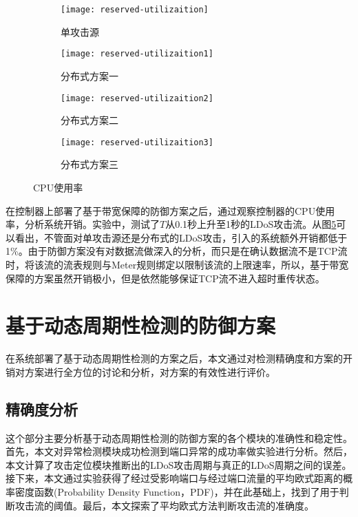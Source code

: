 \begin{figure}
    \begin{subfigure}{.49\textwidth}
        \centering
        \texttt{[image: reserved-utilizaition]}
        \caption{单攻击源}
        \label{fig:reserved-CPU-single}
    \end{subfigure}
    \begin{subfigure}{.49\textwidth}
        \centering
        \texttt{[image: reserved-utilizaition1]}
        \caption{分布式方案一}
        \label{fig:reserved-CPU-2h-mod1}
    \end{subfigure}

    \begin{subfigure}{.49\textwidth}
        \centering
        \texttt{[image: reserved-utilizaition2]}
        \caption{分布式方案二}
        \label{fig:reserved-CPU-2h-mod2}
    \end{subfigure}
    \begin{subfigure}{.49\textwidth}
        \centering
        \texttt{[image: reserved-utilizaition3]}
        \caption{分布式方案三}
        \label{fig:reserved-CPU-2h-mod3}
    \end{subfigure}


    \caption{CPU使用率}
    \label{fig:reserved-CPU-all}
\end{figure}


在控制器上部署了基于带宽保障的防御方案之后，通过观察控制器的CPU使用率，分析系统开销。实验中，测试了$T$从0.1秒上升至1秒的LDoS攻击流。从图\ref{fig:reserved-CPU-all}可以看出，不管面对单攻击源还是分布式的LDoS攻击，引入的系统额外开销都低于1\%。由于防御方案没有对数据流做深入的分析，而只是在确认数据流不是TCP流时，将该流的流表规则与Meter规则绑定以限制该流的上限速率，所以，基于带宽保障的方案虽然开销极小，但是依然能够保证TCP流不进入超时重传状态。




\section{基于动态周期性检测的防御方案}
\label{chap5:exp-period-detection}
在系统部署了基于动态周期性检测的方案之后，本文通过对检测精确度和方案的开销对方案进行全方位的讨论和分析，对方案的有效性进行评价。

\subsection{精确度分析}
\label{chap5:accuracy}
这个部分主要分析基于动态周期性检测的防御方案的各个模块的准确性和稳定性。首先，本文对异常检测模块成功检测到端口异常的成功率做实验进行分析。然后，本文计算了攻击定位模块推断出的LDoS攻击周期与真正的LDoS周期之间的误差。接下来，本文通过实验获得了经过受影响端口与经过端口流量的平均欧式距离的概率密度函数(Probability Density Function，PDF)，并在此基础上，找到了用于判断攻击流的阈值。最后，本文探索了平均欧式方法判断攻击流的准确度。

